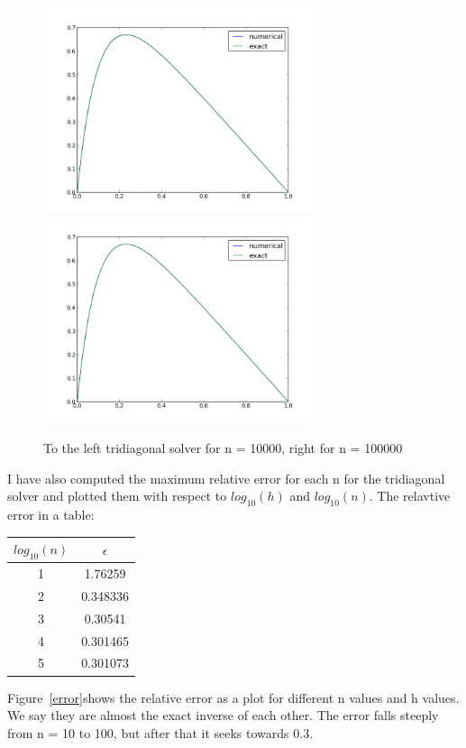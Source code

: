 \documentclass[12pt,a4wide]{article}
\begin{document}
\begin{figure}
	\includegraphics[width=8cm]{project1n10000}
	\includegraphics[width=8cm]{project1n100000}
	\caption{To the left tridiagonal solver for n = 10000, right for n = 100000}
	\label{n10000}
\end{figure}

I have also computed the maximum relative error for each n for the tridiagonal solver and plotted them with respect to ${log_{10}}({h})$ and ${log_{10}}({n})$.
The relavtive error in a table:
\begin{tabular}{|c|c|}
\hline
${log_{10}}({n})$ & $\epsilon$ \\ \hline
	1 & 1.76259 \\ \hline
	2 & 0.348336 \\ \hline
	3 & 0.30541 \\ \hline
	4 & 0.301465 \\ \hline
	5 & 0.301073 \\ \hline
	\hline
\end{tabular} 
Figure~\ref{error}shows the relative error as a plot for different n values and h values. We say they are almost the exact inverse of each other. 
The error falls steeply from n = 10 to 100, but after that it seeks towards 0.3.
\end{document}
